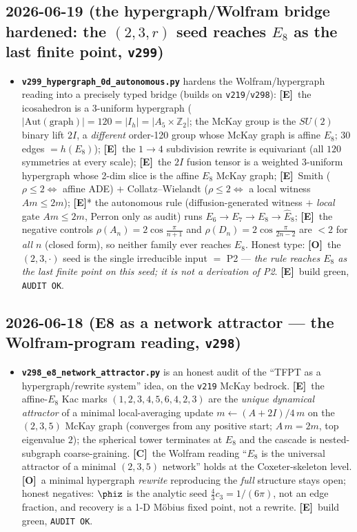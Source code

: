 \documentclass[11pt]{article}
\providecommand{\mE}{\textbf{[E]}}\providecommand{\mC}{\textbf{[C]}}
\providecommand{\mO}{\textbf{[O]}}\providecommand{\mX}{\textbf{[X]}}
\providecommand{\vref}[1]{\texttt{#1}}
\begin{document}
\subsection*{2026-06-19 (the hypergraph/Wolfram bridge hardened: the $(2,3,r)$ seed reaches $E_8$ as the last finite point, \texttt{v299})}
\begin{itemize}
\item \textbf{\texttt{v299\_hypergraph\_0d\_autonomous.py}} hardens the Wolfram/hypergraph reading into a precisely
  typed bridge (builds on \vref{v219}/\vref{v298}): \mE\ the icosahedron is a 3-uniform hypergraph
  ($|\mathrm{Aut(graph)}|=120=|I_h|=|A_5{\times}\mathbb{Z}_2|$; the McKay group is the $SU(2)$ binary lift $2I$, a
  \emph{different} order-120 group whose McKay graph is affine $E_8$; $30$ edges $=h(E_8)$); \mE\ the $1\to4$
  subdivision rewrite is equivariant (all $120$ symmetries at every scale); \mE\ the $2I$ fusion tensor is a
  weighted 3-uniform hypergraph whose 2-dim slice is the affine $E_8$ McKay graph; \mE\ Smith
  ($\rho\le2\Leftrightarrow$ affine ADE) $+$ Collatz--Wielandt ($\rho\le2\Leftrightarrow$ a local witness
  $Am\le2m$); \mE* the autonomous rule (diffusion-generated witness $+$ \emph{local} gate $Am\le2m$, Perron only
  as audit) runs $E_6\to E_7\to E_8\to\hat E_8$; \mE\ the negative controls $\rho(A_n)=2\cos\frac{\pi}{n+1}$ and
  $\rho(D_n)=2\cos\frac{\pi}{2n-2}$ are $<2$ for \emph{all} $n$ (closed form), so neither family ever reaches
  $E_8$. Honest type: \mO\ the $(2,3,\cdot)$ seed is the single irreducible input $=$ P2 --- \emph{the rule
  reaches $E_8$ as the last finite point on this seed; it is not a derivation of P2}. \mE\ build green,
  \texttt{AUDIT OK}.
\end{itemize}

\subsection*{2026-06-18 (E8 as a network attractor --- the Wolfram-program reading, \texttt{v298})}
\begin{itemize}
\item \textbf{\texttt{v298\_e8\_network\_attractor.py}} is an honest audit of the ``TFPT as a hypergraph/rewrite
  system'' idea, on the \vref{v219} McKay bedrock. \mE\ the affine-$E_8$ Kac marks $(1,2,3,4,5,6,4,2,3)$ are the
  \emph{unique dynamical attractor} of a minimal local-averaging update $m\!\leftarrow\!(A{+}2I)/4\,m$ on the
  $(2,3,5)$ McKay graph (converges from any positive start; $A\,m=2m$, top eigenvalue $2$); the spherical tower
  terminates at $E_8$ and the cascade is nested-subgraph coarse-graining. \mC\ the Wolfram reading ``$E_8$ is the
  universal attractor of a minimal $(2,3,5)$ network'' holds at the Coxeter-skeleton level. \mO\ a minimal
  hypergraph \emph{rewrite} reproducing the \emph{full} structure stays open; honest negatives: $\phiz$ is the
  analytic seed $\tfrac{4}{3}c_3=1/(6\pi)$, not an edge fraction, and recovery is a 1-D M\"obius fixed point, not
  a rewrite. \mE\ build green, \texttt{AUDIT OK}.
\end{itemize}
\end{document}
